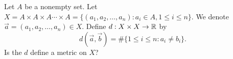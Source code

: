 \documentclass[a4paper]{article}
\begin{document}
Let \( A  \) be a nonempty set. Let \( X = A \times A \times A \cdots \times A = \{ ({a}_{1} ,{a}_{2}, \dots, {a}_{n}) : {a}_{i} \in A , 1 \leq i \leq n  \}  \). We denote \( \vec{ a } = ({a}_{1}, {a}_{2}, \dots, {a}_{n}) \in X    \). Define \( d: X \times X \to \mathbb{R}  \) by 
\[  d(\vec{ a } , \vec{ b } ) = \# \{ 1 \leq i \leq n : {a}_{i} \neq {b}_{i} \} . \]
Is the \( d \) define a metric on \( X  \)? 
\end{document}
